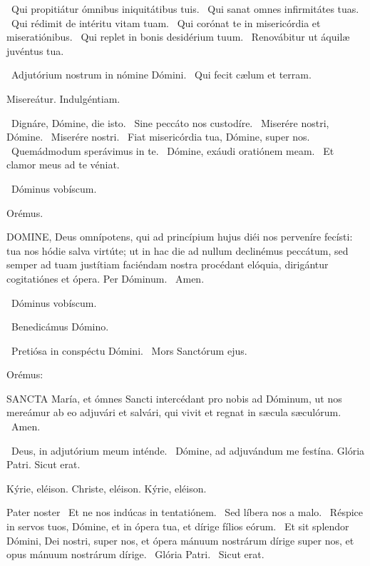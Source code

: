 \V\ Qui propitiátur ómnibus iniquitátibus tuis. \R\ Qui sanat omnes infirmitátes tuas. \V\ Qui rédimit de intéritu vitam tuam. \R\ Qui corónat te in misericórdia et miseratiónibus. \V\ Qui replet in bonis desidérium tuum. \R\ Renovábitur ut áquilæ juvéntus tua.


\V\ Adjutórium nostrum in nómine Dómini. \R\ Qui fecit cælum et terram.

 Misereátur. Indulgéntiam.

\V\ Dignáre, Dómine, die isto. \R\ Sine peccáto nos custodíre. \V\ Miserére nostri, Dómine. \R\ Miserére nostri. \V\ Fiat misericórdia tua, Dómine, super nos. \R\ Quemádmodum sperávimus in te. \V\ Dómine, exáudi oratiónem meam. \R\ Et clamor meus ad te véniat.

\sectionornament

\V\ Dóminus vobíscum.

Orémus. 

\lettrine[lines=2]{D}{OMINE}, Deus omnípotens, qui ad princípium hujus diéi nos perveníre fecísti: tua nos hódie salva virtúte; ut in hac die ad nullum declinémus peccátum, sed semper ad tuam justítiam faciéndam nostra procédant elóquia, dirigántur cogitatiónes et ópera. Per Dóminum. \R\ Amen.

\V\ Dóminus vobíscum.

\V\ Benedicámus Dómino.


\V\ Pretiósa in conspéctu Dómini. \R\ Mors Sanctórum ejus.

 Orémus:


\lettrine[lines=2]{S}{ANCTA} María, et ómnes Sancti intercédant pro nobis ad Dóminum, ut nos mereámur ab eo adjuvári et salvári, qui vivit et regnat in sæcula sæculórum. \R\ Amen.

\V\ Deus, in adjutórium meum inténde. \R\ Dómine, ad adjuvándum me festína.  Glória Patri. Sicut erat.

Kýrie, eléison. Christe, eléison. Kýrie, eléison.

Pater noster  \V\ Et ne nos indúcas in tentatiónem. \R\ Sed líbera nos a malo. \V\ Réspice in servos tuos, Dómine, et in ópera tua, et dírige fílios eórum. \R\ Et sit splendor Dómini, Dei nostri, super nos, et ópera mánuum nostrárum dírige super nos, et opus mánuum nostrárum dírige. \V\ Glória Patri. \R\ Sicut erat.

